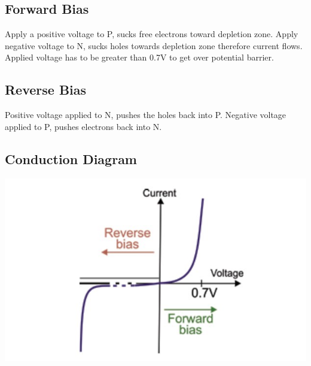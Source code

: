 \documentclass[a4paper,11pt, twocolumn]{article}
\begin{document}
\subsection{Forward Bias}
Apply a positive voltage to P, sucks free electrons toward depletion zone. Apply negative voltage to N, sucks holes towards depletion zone therefore current flows. Applied voltage has to be greater than 0.7V to get over potential barrier.
\subsection{Reverse Bias}
Positive voltage applied to N, pushes the holes back into P. Negative voltage applied to P, pushes electrons back into N.
\subsection{Conduction Diagram}
\includegraphics[width=\linewidth]{conductionDiagram.jpg}
\end{document}
